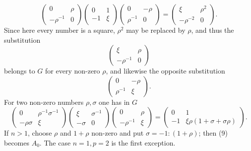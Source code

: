 \documentclass[11pt]{article}
\begin{document}
\[
 \begin{pmatrix}0&\rho\\-\rho^{-1}&0\end{pmatrix}
 \begin{pmatrix}0&1\\-1&\xi\end{pmatrix}
 \begin{pmatrix}0&-\rho\\\rho^{-1}&0\end{pmatrix}
 =
 \begin{pmatrix}\xi&\rho^2\\-\rho^{-2}&0\end{pmatrix}.
\]
Since here every number is a square, $\rho^2$ may be replaced by $\rho$, and thus the substitution
\[
 \begin{pmatrix}\xi&\rho\\-\rho^{-1}&0\end{pmatrix}
\]
belongs to $G$ for every non-zero $\rho$, and likewise the opposite substitution
\[
 \begin{pmatrix}0&-\rho\\\rho^{-1}&\xi\end{pmatrix}.
\]
For two non-zero numbers $\rho,\sigma$ one has in $G$
\begin{equation}
 \begin{pmatrix}0&\rho^{-1}\sigma^{-1}\\-\rho\sigma&\xi\end{pmatrix}
 \begin{pmatrix}\xi&\sigma^{-1}\\-\sigma&0\end{pmatrix}
 \begin{pmatrix}0&\rho\\-\rho^{-1}&\xi\end{pmatrix}
 =
 \begin{pmatrix}0&1\\-1&\xi\rho(1+\sigma+\sigma\rho)\end{pmatrix}.
 \tag{9}
\end{equation}
If $n>1$, choose $\rho$ and $1+\rho$ non-zero and put $\sigma=-1:(1+\rho)$; then (9) becomes $A_0$. The case $n=1,p=2$ is the first exception.
\end{document}
